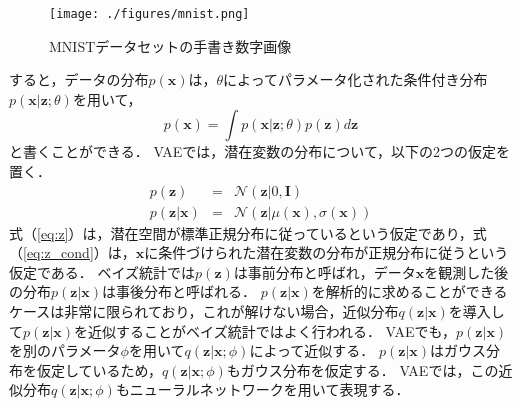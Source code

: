 \begin{figure}[tbp]
\begin{center}
\texttt{[image: ./figures/mnist.png]}
\caption{MNISTデータセットの手書き数字画像}
\label{fig:mnist}
\end{center}
\end{figure}

すると，データの分布$p(\bm{x})$は，$\theta$によってパラメータ化された条件付き分布$p(\bm{x}| \bm{z}; \theta)$を用いて，
\begin{equation}
p(\bm{x}) = \int p(\bm{x}|\bm{z};\theta) p(\bm{z}) d\bm{z} \label{eq:vae}
\end{equation}
と書くことができる．
VAEでは，潜在変数の分布について，以下の2つの仮定を置く．
\begin{eqnarray}
p(\bm{z}) &=& \mathcal{N}(\bm{z}|0,\bm{I}) \label{eq:z}\\
p(\bm{z}|\bm{x}) &=& \mathcal{N}(\bm{z}|\mu(\bm{x}),\sigma(\bm{x}))	\label{eq:z_cond}
\end{eqnarray}
式（\ref{eq:z}）は，潜在空間が標準正規分布に従っているという仮定であり，式（\ref{eq:z_cond}）は，$\bm{x}$に条件づけられた潜在変数の分布が正規分布に従うという仮定である．
ベイズ統計では$p(\bm{z})$は事前分布と呼ばれ，データ$\bm{x}$を観測した後の分布$p(\bm{z}|\bm{x})$は事後分布と呼ばれる．
$p(\bm{z}|\bm{x})$を解析的に求めることができるケースは非常に限られており，これが解けない場合，近似分布$q(\bm{z}|\bm{x})$を導入して$p(\bm{z}|\bm{x})$を近似することがベイズ統計ではよく行われる．
VAEでも，$p(\bm{z}| \bm{x})$を別のパラメータ$\phi$を用いて$q(\bm{z}|\bm{x};\phi)$によって近似する．
$p(\bm{z}|\bm{x})$はガウス分布を仮定しているため，$q(\bm{z}|\bm{x};\phi)$もガウス分布を仮定する．
VAEでは，この近似分布$q(\bm{z}|\bm{x};\phi)$もニューラルネットワークを用いて表現する．

